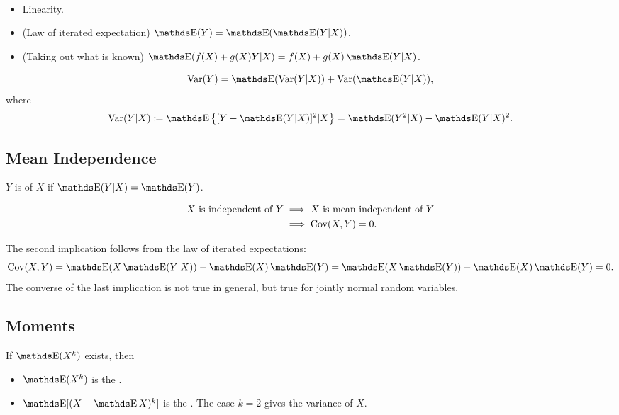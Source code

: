 \documentclass[letterpaper, 10pt]{article}
\begin{document}
\begin{proposition}~
  \begin{itemize}
    \item Linearity.
    \item (Law of iterated expectation) \(\E(Y) = \E(\E(Y|X))\).
    \item (Taking out what is known) \(\E(f(X) + g(X) Y | X) = f(X) + g(X) \E(Y|X)\).
  \end{itemize}
\end{proposition}

\begin{proposition}
  \[
    \Var(Y)
    = \E(\Var(Y|X)) + \Var(\E(Y|X)),
  \]
  where
  \[
    \Var(Y|X) \coloneqq \E\left\{ [Y - \E(Y|X)]^2 | X \right\} = \E(Y^2|X) - \E(Y|X)^2.
  \]
\end{proposition}

\subsection{Mean Independence}
\begin{definition}
  \(Y\) is  of \(X\) if \(\E(Y|X) = \E(Y)\).
\end{definition}

\begin{proposition}
  \begin{align*}
    X \text{ is independent of } Y
    &\implies
    X \text{ is mean independent of } Y \\
    &\implies \operatorname{Cov}(X, Y) = 0.
  \end{align*}
\end{proposition}
The second implication follows from the law of iterated expectations:
\[
  \Cov(X, Y)
  = \E(X \E(Y|X)) - \E(X) \E(Y)
  = \E(X \E(Y)) - \E(X) \E(Y)
  = 0.
\]
The converse of the last implication is not true in general, but true for jointly normal random variables.


\subsection{Moments}
\begin{definition}
  If \(\E(X^k)\) exists, then
  \begin{itemize}
    \item \(\E(X^k)\) is the .
    \item \(\E[(X - \E X)^k]\) is the .
      The case \(k = 2\) gives the variance of \(X\).
  \end{itemize}
\end{definition}
\end{document}
